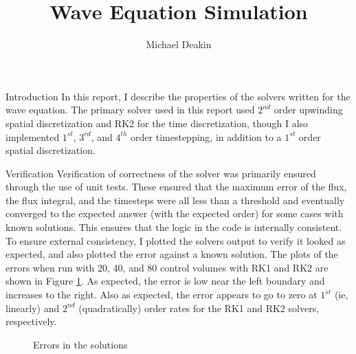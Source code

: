 \documentclass{article}
\title{Wave Equation Simulation}
\author{Michael Deakin}
\begin{document}
\maketitle

\begin{section}{Introduction}
In this report, I describe the properties of the solvers written for the wave equation.
The primary solver used in this report used $2^{nd}$ order upwinding spatial discretization
and RK2 for the time discretization, though I also implemented $1^{st}$, $3^{rd}$,
and $4^{th}$ order timestepping, in addition to a $1^{st}$ order spatial discretization.
\end{section}

\begin{section}{Verification}
Verification of correctness of the solver was primarily ensured through the use of unit tests.
These ensured that the maximum error of the flux, the flux integral,
and the timesteps were all less than a threshold and eventually converged to the expected answer
(with the expected order) for some cases with known solutions.
This ensures that the logic in the code is internally consistent.
To ensure external consistency, I plotted the solvers output to verify it looked as expected,
and also plotted the error against a known solution.
The plots of the errors when run with 20, 40, and 80 control volumes with RK1 and RK2
are shown in Figure \ref{rk_errors}.
As expected, the error is low near the left boundary and increases to the right.
Also as expected, the error appears to go to zero at $1^{st}$ (ie, linearly)
and $2^{nd}$ (quadratically) order rates for the RK1 and RK2 solvers, respectively.
\begin{figure}[ht]
  \caption{Errors in the solutions}
  \label{rk_errors}
\end{figure}


\end{section}
\end{document}

